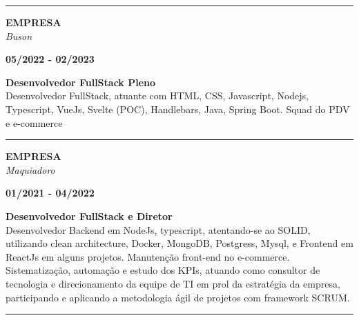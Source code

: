 \documentclass[12pt, a4paper]{article}
\newcommand{\LlinhaM}{1pt} 	 %
\newcommand{\TlinhaM}{17cm}		 %
\begin{document}
\begin{center} %
	\rule{\TlinhaM}{\LlinhaM}
\end{center}

\begin{multicols}{2}
	\begin{flushleft}
		\textbf{EMPRESA}\\
		\textit{Buson}\\
	\end{flushleft}
	\vfill
	\begin{flushright}
		\textbf{05/2022 - 02/2023}\\
	\end{flushright}
\end{multicols}
\begin{flushleft}
	\textbf{Desenvolvedor FullStack Pleno}\\
	Desenvolvedor FullStack, atuante com HTML, CSS, Javascript, Nodejs, Typescript, VueJs, Svelte (POC), Handlebars,
	Java, Spring Boot. Squad do PDV e e-commerce
\end{flushleft}

\begin{center} %
	\rule{\TlinhaM}{\LlinhaM}
\end{center}

\begin{multicols}{2}
	\begin{flushleft}
		\textbf{EMPRESA}\\
		\textit{Maquiadoro}\\
	\end{flushleft}
	\vfill
	\begin{flushright}
		\textbf{01/2021 - 04/2022}\\
	\end{flushright}
\end{multicols}
\begin{flushleft}
	\textbf{Desenvolvedor FullStack e Diretor}\\
	Desenvolvedor Backend em NodeJs, typescript, atentando-se ao SOLID, utilizando clean architecture, Docker, MongoDB, Postgress, Mysql,
	e Frontend em ReactJs em alguns projetos. Manutenção front-end no e-commerce.
	Sistematização, automação e estudo dos KPIs, atuando como consultor de tecnologia e direcionamento da equipe de TI em prol da estratégia da empresa,
	participando e aplicando a metodologia ágil de projetos com framework SCRUM.
\end{flushleft}

\begin{center} %
	\rule{\TlinhaM}{\LlinhaM}
\end{center}
\end{document}
